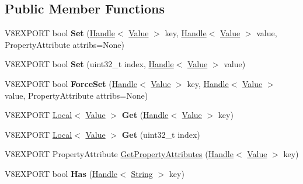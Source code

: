 \subsection*{Public Member Functions}
\begin{DoxyCompactItemize}
\item 
\hypertarget{classv8_1_1_object_a97717c7b7fdc556c3a7fad14877ca912}{}V8\+E\+X\+P\+O\+R\+T bool {\bfseries Set} (\hyperlink{classv8_1_1_handle}{Handle}$<$ \hyperlink{classv8_1_1_value}{Value} $>$ key, \hyperlink{classv8_1_1_handle}{Handle}$<$ \hyperlink{classv8_1_1_value}{Value} $>$ value, Property\+Attribute attribs=None)\label{classv8_1_1_object_a97717c7b7fdc556c3a7fad14877ca912}

\item 
\hypertarget{classv8_1_1_object_aa588c4de7f0e4db47a2f22acfaa774fd}{}V8\+E\+X\+P\+O\+R\+T bool {\bfseries Set} (uint32\+\_\+t index, \hyperlink{classv8_1_1_handle}{Handle}$<$ \hyperlink{classv8_1_1_value}{Value} $>$ value)\label{classv8_1_1_object_aa588c4de7f0e4db47a2f22acfaa774fd}

\item 
\hypertarget{classv8_1_1_object_a42bf74b18b3d9280612620df3d2c13e0}{}V8\+E\+X\+P\+O\+R\+T bool {\bfseries Force\+Set} (\hyperlink{classv8_1_1_handle}{Handle}$<$ \hyperlink{classv8_1_1_value}{Value} $>$ key, \hyperlink{classv8_1_1_handle}{Handle}$<$ \hyperlink{classv8_1_1_value}{Value} $>$ value, Property\+Attribute attribs=None)\label{classv8_1_1_object_a42bf74b18b3d9280612620df3d2c13e0}

\item 
\hypertarget{classv8_1_1_object_a59bd849c1cdb2aa1033423ee21b2ede9}{}V8\+E\+X\+P\+O\+R\+T \hyperlink{classv8_1_1_local}{Local}$<$ \hyperlink{classv8_1_1_value}{Value} $>$ {\bfseries Get} (\hyperlink{classv8_1_1_handle}{Handle}$<$ \hyperlink{classv8_1_1_value}{Value} $>$ key)\label{classv8_1_1_object_a59bd849c1cdb2aa1033423ee21b2ede9}

\item 
\hypertarget{classv8_1_1_object_a7310ce3ee18744c0971356dad8e2bed1}{}V8\+E\+X\+P\+O\+R\+T \hyperlink{classv8_1_1_local}{Local}$<$ \hyperlink{classv8_1_1_value}{Value} $>$ {\bfseries Get} (uint32\+\_\+t index)\label{classv8_1_1_object_a7310ce3ee18744c0971356dad8e2bed1}

\item 
V8\+E\+X\+P\+O\+R\+T Property\+Attribute \hyperlink{classv8_1_1_object_a1e0346ba95c50258a2b4dbd3dc5a6221}{Get\+Property\+Attributes} (\hyperlink{classv8_1_1_handle}{Handle}$<$ \hyperlink{classv8_1_1_value}{Value} $>$ key)
\item 
\hypertarget{classv8_1_1_object_ada7a824246df2e8a9b7476bd63a54b2e}{}V8\+E\+X\+P\+O\+R\+T bool {\bfseries Has} (\hyperlink{classv8_1_1_handle}{Handle}$<$ \hyperlink{classv8_1_1_string}{String} $>$ key)\label{classv8_1_1_object_ada7a824246df2e8a9b7476bd63a54b2e}


\end{DoxyCompactItemize}
